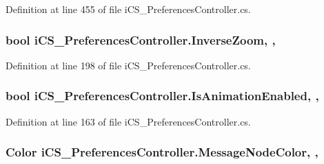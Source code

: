 Definition at line 455 of file i\+C\+S\+\_\+\+Preferences\+Controller.\+cs.

\hypertarget{classi_c_s___preferences_controller_ab8ce5f3533cc8002a269e3c62c90ea5c}{
\subsubsection[{Inverse\+Zoom}]{\setlength{\rightskip}{0pt plus 5cm}bool i\+C\+S\+\_\+\+Preferences\+Controller.\+Inverse\+Zoom\hspace{0.3cm}{\ttfamily [static]}, {\ttfamily [get]}, {\ttfamily [set]}}}\label{classi_c_s___preferences_controller_ab8ce5f3533cc8002a269e3c62c90ea5c}


Definition at line 198 of file i\+C\+S\+\_\+\+Preferences\+Controller.\+cs.

\hypertarget{classi_c_s___preferences_controller_a039d0d69d4c26caaebed6d6006cea643}{
\subsubsection[{Is\+Animation\+Enabled}]{\setlength{\rightskip}{0pt plus 5cm}bool i\+C\+S\+\_\+\+Preferences\+Controller.\+Is\+Animation\+Enabled\hspace{0.3cm}{\ttfamily [static]}, {\ttfamily [get]}, {\ttfamily [set]}}}\label{classi_c_s___preferences_controller_a039d0d69d4c26caaebed6d6006cea643}


Definition at line 163 of file i\+C\+S\+\_\+\+Preferences\+Controller.\+cs.

\hypertarget{classi_c_s___preferences_controller_ae6377fce03536d45f62667ae262b1ef4}{
\subsubsection[{Message\+Node\+Color}]{\setlength{\rightskip}{0pt plus 5cm}Color i\+C\+S\+\_\+\+Preferences\+Controller.\+Message\+Node\+Color\hspace{0.3cm}{\ttfamily [static]}, {\ttfamily [get]}, {\ttfamily [set]}}}\label{classi_c_s___preferences_controller_ae6377fce03536d45f62667ae262b1ef4}


